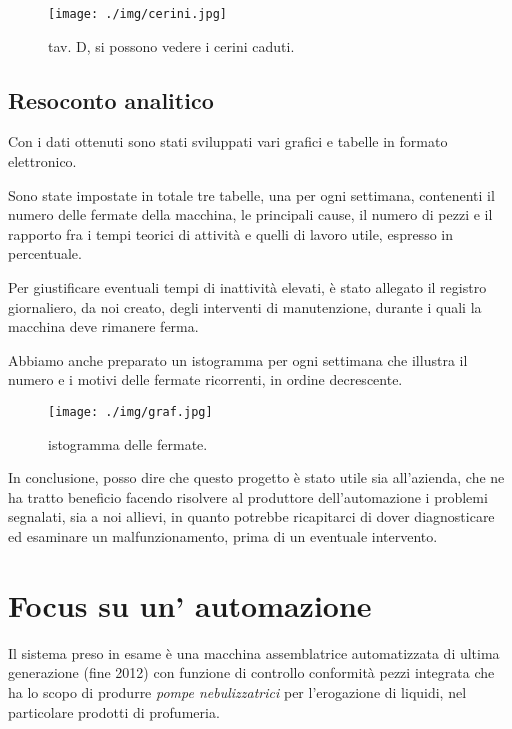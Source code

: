 \documentclass[a4paper,14pt,twoside]{extarticle} %
\begin{document}
\begin{figure}[ht!]
\centering \sf \tiny
\texttt{[image: ./img/cerini.jpg]}
\caption{\small \sf tav. D, si possono vedere i cerini caduti.}
\end{figure}
\newpage
\subsection{Resoconto analitico}\label{sec:dati}
Con i dati ottenuti sono stati sviluppati vari grafici e tabelle in formato elettronico.

Sono state impostate in totale tre tabelle, una per ogni settimana, contenenti il numero delle fermate della macchina, le principali cause, il numero di pezzi e il rapporto fra i tempi teorici di attività e quelli di lavoro utile, espresso in percentuale.

Per giustificare eventuali tempi di inattività elevati, è stato allegato il registro giornaliero, da noi creato, degli interventi di manutenzione, durante i quali la macchina deve rimanere ferma.

Abbiamo anche preparato un istogramma per ogni settimana che illustra il numero e i motivi delle fermate ricorrenti, in ordine decrescente.
\begin{figure}[ht!]
\centering \sf \tiny
\texttt{[image: ./img/graf.jpg]}
\caption{\small \sf istogramma delle fermate.}
\end{figure}

In conclusione, posso dire che questo progetto è stato utile sia all'azienda, che ne ha tratto beneficio facendo risolvere al produttore dell'automazione i problemi segnalati, sia a noi allievi, in quanto potrebbe ricapitarci di dover diagnosticare ed esaminare un malfunzionamento, prima di un eventuale intervento.

\newpage
\section{Focus su un' automazione}\label{sec:focus}
Il sistema preso in esame è una macchina assemblatrice automatizzata di ultima generazione (fine 2012) con funzione di  controllo conformità pezzi integrata che ha lo scopo di produrre \emph{pompe nebulizzatrici} per l'erogazione di liquidi,  nel particolare prodotti di profumeria.
\end{document}
